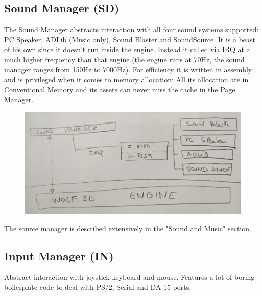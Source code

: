 \documentclass[book.tex]{subfiles}
\begin{document}
\subsection{Sound Manager (SD)}
The Sound Manager abstracts interaction with all four sound systems supported: PC Speaker, ADLib (Music only), Sound Blaster and SoundSource. It is a beast of his own since it doesn't run inside the engine. Instead it called via IRQ at a much higher frequency than that engine (the engine runs at 70Hz, the sound manager ranges from 150Hz to 7000Hz). For efficiency it is written in assembly and is privileged when it comes to memory allocation: All its allocation are in Conventional Memory and its assets can never miss the cache in the Page Manager.\\
 \par
\begin{figure}[H]
\centering
 \includegraphics[width=\textwidth]{imgs/sound_manager_architecture.png}
 \end{figure}
 \par
The source manager is described extensively in the "Sound and Music" section.

















\subsection{Input Manager (IN)}
Abstract interaction with joystick keyboard and mouse. Features a lot of boring boilerplate code to deal with PS/2, Serial and DA-15 ports.
\end{document}
